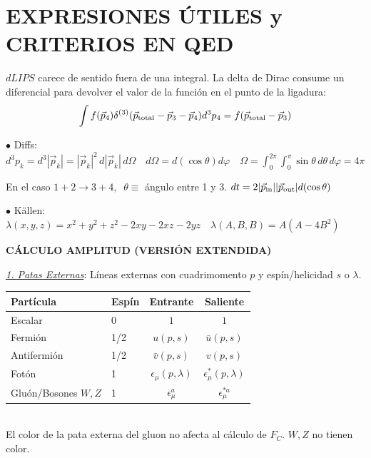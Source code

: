 \section{EXPRESIONES ÚTILES y CRITERIOS EN QED}
$dLIPS$ carece de sentido fuera de una integral. La delta de Dirac consume un diferencial para devolver el valor de la función en el punto de la ligadura:$$\int f(\vec{p}_4) \delta^{(3)}(\vec{p}_{\rm total} - \vec{p}_3 - \vec{p}_4) d^3 p_4 = f(\vec{p}_{\rm total} - \vec{p}_3)$$


$\bullet$ Diffs: $d^3 p_k \!=\! d^3 |\vec{p}_k|\!=\!|\vec{p}_k|^2\, d|\vec{p}_k| \, d\Omega\quad d\Omega \!=\! d(\cos\theta)d\varphi\quad \Omega \!=\! \int_{0}^{2\pi} \int_{0}^{\pi} \sin \theta \, d\theta \, d\varphi\! =\! 4\pi$
\vspace{4pt}

En el caso $1+2 \rightarrow 3+4, \;\; \theta \equiv$ ángulo entre 1 y 3. \qquad $dt = 2 |\vec{p}_{\rm in}||\vec{p}_{\rm out}| d(\cos \theta)$

$\bullet$ Källen: $\lambda(x,y,z) = x^2+y^2+z^2-2xy-2xz-2yz \quad \lambda(A,B,B)=A(A-4B^2)$


\textbf{CÁLCULO AMPLITUD (VERSIÓN EXTENDIDA)}

\underline{\textit{1. Patas Externas}}: Líneas externas con cuadrimomento $p$ y espín/helicidad $s$ o $\lambda$.

{

\centering
\begin{tabular}{llcc}
\hline
\textbf{Partícula} & \textbf{Espín} & \textbf{Entrante} & \textbf{Saliente} \\
\hline
Escalar       & 0   & $1$                        & $1$                         \\
Fermión       & 1/2 & $u(p,s)$                   & $\bar{u}(p,s)$              \\
Antifermión   & 1/2 & $\bar{v}(p,s)$             & $v(p,s)$                    \\
Fotón         & 1   & $\epsilon_\mu(p,\lambda)$  & $\epsilon^*_{\mu}(p,\lambda)$\\
Gluón/Bosones $W,Z$ & 1 & $\epsilon_\mu^{a}$ & $\epsilon_{ \mu}^{* a}$\\
\hline
\end{tabular}\\
El color de la pata externa del gluon no afecta al cálculo de $F_C$. $W,Z$ no tienen color. 



}

\vspace{2pt}

